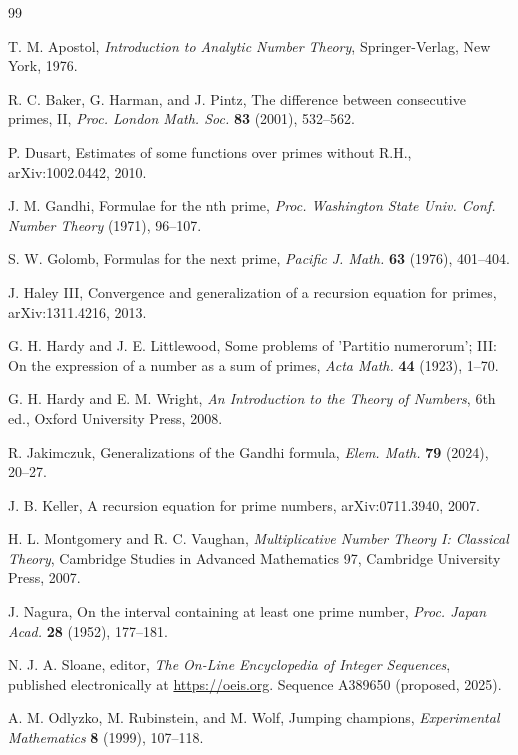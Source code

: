\documentclass[12pt]{article}
\theoremstyle{plain}
\theoremstyle{definition}
\theoremstyle{remark}
\begin{document}
\begin{thebibliography}{99}

 T. M. Apostol, \emph{Introduction to Analytic Number Theory}, Springer-Verlag, New York, 1976.

 R. C. Baker, G. Harman, and J. Pintz, The difference between consecutive primes, II, \emph{Proc. London Math. Soc.} \textbf{83} (2001), 532--562.

 P. Dusart, Estimates of some functions over primes without R.H., arXiv:1002.0442, 2010.

 J. M. Gandhi, Formulae for the nth prime, \emph{Proc. Washington State Univ. Conf. Number Theory} (1971), 96--107.

 S. W. Golomb, Formulas for the next prime, \emph{Pacific J. Math.} \textbf{63} (1976), 401--404.

 J. Haley III, Convergence and generalization of a recursion equation for primes, arXiv:1311.4216, 2013.

 G. H. Hardy and J. E. Littlewood, Some problems of 'Partitio numerorum'; III: On the expression of a number as a sum of primes, \emph{Acta Math.} \textbf{44} (1923), 1--70.

 G. H. Hardy and E. M. Wright, \emph{An Introduction to the Theory of Numbers}, 6th ed., Oxford University Press, 2008.

 R. Jakimczuk, Generalizations of the Gandhi formula, \emph{Elem. Math.} \textbf{79} (2024), 20--27.

 J. B. Keller, A recursion equation for prime numbers, arXiv:0711.3940, 2007.

 H. L. Montgomery and R. C. Vaughan, \emph{Multiplicative Number Theory I: Classical Theory}, Cambridge Studies in Advanced Mathematics 97, Cambridge University Press, 2007.

 J. Nagura, On the interval containing at least one prime number, \emph{Proc. Japan Acad.} \textbf{28} (1952), 177--181.

 N. J. A. Sloane, editor, \emph{The On-Line Encyclopedia of Integer Sequences}, published electronically at \url{https://oeis.org}. Sequence A389650 (proposed, 2025).

 A. M. Odlyzko, M. Rubinstein, and M. Wolf, Jumping champions, \emph{Experimental Mathematics} \textbf{8} (1999), 107--118.


\end{thebibliography}
\end{document}
